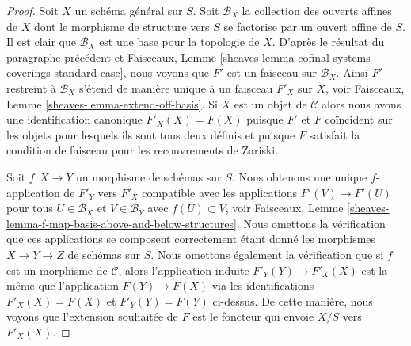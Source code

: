 \begin{proof}
\medskip\noindent
Soit $X$ un schéma général sur $S$. Soit $\mathcal{B}_X$ la collection des ouverts affines de $X$ dont le morphisme de structure vers $S$ se factorise par un ouvert affine de $S$. Il est clair que $\mathcal{B}_X$ est une base pour la topologie de $X$. D'après le résultat du paragraphe précédent et Faisceaux, Lemme \ref{sheaves-lemma-cofinal-systems-coverings-standard-case}, nous voyons que $F'$ est un faisceau sur $\mathcal{B}_X$. Ainsi $F'$ restreint à $\mathcal{B}_X$ s'étend de manière unique à un faisceau $F'_X$ sur $X$, voir Faisceaux, Lemme \ref{sheaves-lemma-extend-off-basis}. Si $X$ est un objet de $\mathcal{C}$ alors nous avons une identification canonique $F'_X(X) = F(X)$ puisque $F'$ et $F$ coïncident sur les objets pour lesquels ils sont tous deux définis et puisque $F$ satisfait la condition de faisceau pour les recouvrements de Zariski.

\medskip\noindent
Soit $f : X \to Y$ un morphisme de schémas sur $S$. Nous obtenons une unique $f$-application de $F'_Y$ vers $F'_X$ compatible avec les applications $F'(V) \to F'(U)$ pour tous $U \in \mathcal{B}_X$ et $V \in \mathcal{B}_Y$ avec $f(U) \subset V$, voir Faisceaux, Lemme \ref{sheaves-lemma-f-map-basis-above-and-below-structures}. Nous omettons la vérification que ces applications se composent correctement étant donné les morphismes $X \to Y \to Z$ de schémas sur $S$. Nous omettons également la vérification que si $f$ est un morphisme de $\mathcal{C}$, alors l'application induite $F'_Y(Y) \to F'_X(X)$ est la même que l'application $F(Y) \to F(X)$ via les identifications $F'_X(X) = F(X)$ et $F'_Y(Y) = F(Y)$ ci-dessus. De cette manière, nous voyons que l'extension souhaitée de $F$ est le foncteur qui envoie $X/S$ vers $F'_X(X)$.


\end{proof}
